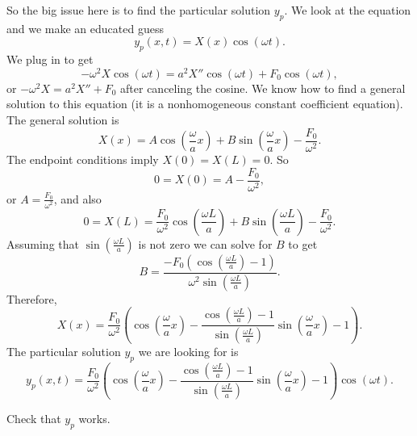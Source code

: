 So the big issue here is to find the particular solution $y_p$.
We look at the equation and we make an educated guess
\begin{equation*}
y_p(x,t) = X(x) \cos (\omega t) .
\end{equation*}
We plug in to get
\begin{equation*}
-\omega^2 X \cos ( \omega t) = a^2 X'' \cos ( \omega t) +
F_0 \cos ( \omega t ) ,
\end{equation*}
or
$-\omega^2 X = a^2 X'' + F_0$ after canceling the cosine.
We know how to find a general solution to this equation (it is a
nonhomogeneous constant coefficient equation).
The general solution is
\begin{equation*}
X(x) = A \cos \left( \frac{\omega}{a} x \right)
+ B \sin \left( \frac{\omega}{a} x \right) -
\frac{F_0}{\omega^2} .
\end{equation*}
The endpoint conditions imply $X(0) = X(L) = 0$.  So
\begin{equation*}
0 = X(0) = A - \frac{F_0}{\omega^2} ,
\end{equation*}
or $A = \frac{F_0}{\omega^2}$, and also
\begin{equation*}
0 = X(L)
= \frac{F_0}{\omega^2} \cos \left( \frac{\omega L}{a} \right)
+ B \sin \left( \frac{\omega L}{a} \right) -
\frac{F_0}{\omega^2} .
\end{equation*}
Assuming that $\sin ( \frac{\omega L}{a} )$ is not zero we can solve for $B$ to
get
\begin{equation} \label{natfreq:Beq}
B = 
\frac{-F_0 \left( \cos \left( \frac{\omega L}{a} \right) - 1 \right)}%
{\omega^2 \sin \left( \frac{\omega L}{a} \right)}.
\end{equation}
Therefore,
\begin{equation*}
X(x) =
\frac{F_0}{\omega^2} \left(
\cos \left(  \frac{\omega}{a} x \right) -
\frac{\cos \left( \frac{\omega L}{a} \right) - 1}%
{\sin \left( \frac{\omega L}{a} \right)}
\sin \left( \frac{\omega}{a} x \right)
- 1
\right) .
\end{equation*}
The particular solution $y_p$ we are looking for is
\begin{equation*}
\boxed{~~
y_p(x,t) =
\frac{F_0}{\omega^2} \left(
\cos \left( \frac{\omega}{a} x \right) -
\frac{\cos \left( \frac{\omega L}{a} \right) - 1}%
{\sin \left( \frac{\omega L}{a}\right)}
\sin \left( \frac{\omega}{a} x \right)
-1
\right)
\cos ( \omega t) .
~~}
\end{equation*}

\begin{exercise}
Check that $y_p$ works.
\end{exercise}

